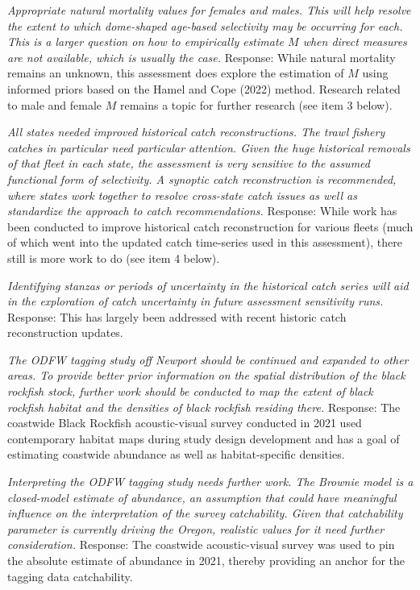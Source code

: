 \documentclass[11pt,
  english,
  letterpaper,
]{article}
\begin{document}
\textit{Appropriate natural mortality values for females and males. This will help resolve the extent to which dome-shaped age-based selectivity may be occurring for each. This is a larger question on how to empirically estimate $M$ when direct measures are not available, which is usually the case.} Response: While natural mortality remains an unknown, this assessment does explore the estimation of \(M\) using informed priors based on the Hamel and Cope (2022) method. Research related to male and female \(M\) remains a topic for further research (see item 3 below).

\textit{All states needed improved historical catch reconstructions. The trawl fishery catches in particular need particular attention. Given the huge historical removals of that fleet in each state, the assessment is very sensitive to the assumed functional form of selectivity. A synoptic catch reconstruction is recommended, where states work together to resolve cross-state catch issues as well as standardize the approach to catch recommendations.} Response: While work has been conducted to improve historical catch reconstruction for various fleets (much of which went into the updated catch time-series used in this assessment), there still is more work to do (see item 4 below).

\textit{Identifying stanzas or periods of uncertainty in the historical catch series will aid in the exploration of catch uncertainty in future assessment sensitivity runs.} Response: This has largely been addressed with recent historic catch reconstruction updates.

\textit{The ODFW tagging study off Newport should be continued and expanded to other areas. To provide better prior information on the spatial distribution of the black rockfish stock, further work should be conducted to map the extent of black rockfish habitat and the densities of black rockfish residing there.} Response: The coastwide Black Rockfish acoustic-visual survey conducted in 2021 used contemporary habitat maps during study design development and has a goal of estimating coastwide abundance as well as habitat-specific densities.

\textit{Interpreting the ODFW tagging study needs further work. The Brownie model is a closed-model estimate of abundance, an assumption that could have meaningful influence on the interpretation of the survey catchability. Given that catchability parameter is currently driving the Oregon, realistic values for it need further consideration.} Response: The coastwide acoustic-visual survey was used to pin the absolute estimate of abundance in 2021, thereby providing an anchor for the tagging data catchability.
\end{document}
